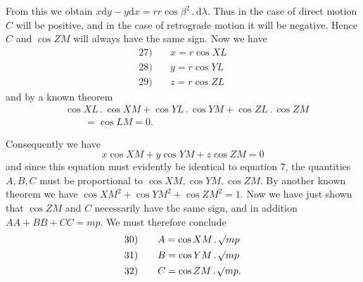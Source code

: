 \par From this we obtain \(x\mathrm{d}y-y\mathrm{d}x=rr\cos\beta^2\mathbin{.}\mathrm{d}\lambda\). Thus in the case of direct motion \(C\) will be positive, and in the case of retrograde motion it will be negative. Hence \(C\) and \(\cos ZM\) will always have the same sign. Now we have
\[
\begin{array}{rl}
27)\quad&x=r\cos XL\\[4pt]
28)\quad&y=r\cos YL\\[4pt]
29)\quad&z=r\cos ZL
\end{array}
\]
and by a known theorem
\[
\begin{aligned}
&\cos XL\mathbin{.}\cos XM+\cos YL\mathbin{.}\cos YM+\cos ZL\mathbin{.}\cos ZM\\
&\qquad=\cos LM=0.
\end{aligned}
\]
\par Consequently we have
\[
x\cos XM+y\cos YM+z\cos ZM=0
\]
and since this equation must evidently be identical to equation 7, the quantities \(A,B,C\) must be proportional to \(\cos XM,\cos YM,\cos ZM\). By another known theorem we have \(\cos XM^2+\cos YM^2+\cos ZM^2=1\). Now we have just shown that \(\cos ZM\) and \(C\) necessarily have the same sign, and in addition \(AA+BB+CC=mp\). We must therefore conclude
\[
\begin{array}{rl}
30)\quad&A=\cos XM\mathbin{.}\mathord{{}^{}\!\surd}mp\\[4pt]
31)\quad&B=\cos YM\mathbin{.}\mathord{{}^{}\!\surd}mp\\[4pt]
32)\quad&C=\cos ZM\mathbin{.}\mathord{{}^{}\!\surd}mp.
\end{array}
\]
